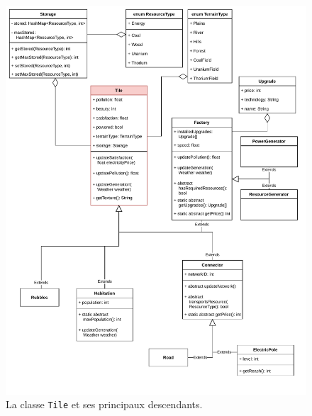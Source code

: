 \documentclass[12pt]{article}
\begin{document}
\begin{figure}[ht]
\includegraphics[width=\textwidth]{uml-classes-Page-3}
\caption{La classe \texttt{Tile} et ses principaux descendants.\label{fig:tile}}
\end{figure}
\end{document}
